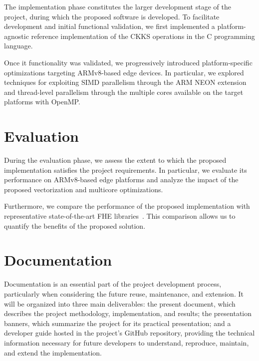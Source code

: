 The implementation phase constitutes the larger development stage of the project, during which the proposed software is developed. To facilitate development and initial functional validation, we first implemented a platform-agnostic reference implementation of the CKKS operations in the C programming language.

Once it functionality was validated, we progressively introduced platform-specific optimizations targeting ARMv8-based edge devices. In particular, we explored techniques for exploiting SIMD parallelism through the ARM NEON extension and thread-level parallelism through the multiple cores available on the target platforms with OpenMP.

\section{Evaluation}
\label{metodo:eval}

During the evaluation phase, we assess the extent to which the proposed implementation satisfies the project requirements. In particular, we evaluate its performance on ARMv8-based edge platforms and analyze the impact of the proposed vectorization and multicore optimizations.

Furthermore, we compare the performance of the proposed implementation with representative state-of-the-art FHE libraries~\cite{al2022openfhe,sealcrypto,brakerski2014leveled}. This comparison allows us to quantify the benefits of the proposed solution.

\section{Documentation}
\label{metodo:doc}

Documentation is an essential part of the project development process, particularly when considering the future reuse, maintenance, and extension. It will be organized into three main deliverables: the present document, which describes the project methodology, implementation, and results; the presentation banners, which summarize the project for its practical presentation; and a developer guide hosted in the project's GitHub repository, providing the technical information necessary for future developers to understand, reproduce, maintain, and extend the implementation.

